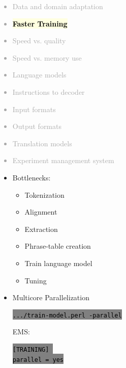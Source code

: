 \documentclass[landscape]{uedslides2C}
\newcommand{\currenttopic}[1]{\colorbox{lightyellow}{\textcolor{black}{\bf #1}}}
\newcommand{\littlecode}[1]{\colorbox{gray}{\textcolor{black}{\small \tt #1}}}
\begin{document}

\vspace{-5mm}
\textcolor{darkgrey}{
\begin{itemize} \itemsep -1mm
\item Data and domain adaptation
\item \currenttopic{Faster Training}
\item Speed vs. quality
\item Speed vs. memory use
\item Language models
\item Instructions to decoder
\item Input formats
\item Output formats
\item Translation models
\item Experiment management system
\end{itemize}
}



\begin{itemize} \itemsep -1mm
\item {Bottlenecks:} 
  \begin{itemize}
  \item Tokenization
  \item Alignment
  \item Extraction
  \item Phrase-table creation
  \item Train language model
  \item Tuning
  \end{itemize}
\end{itemize}



\begin{itemize} \itemsep -1mm

\item {Multicore Parallelization} 
  \begin{center}
    \littlecode{.../train-model.perl -parallel}
  \end{center}      
    EMS: 
  \begin{center}
    \littlecode{[TRAINING] } \\
    \littlecode{parallel = yes}
  \end{center}      
\end{itemize}
\end{document}
